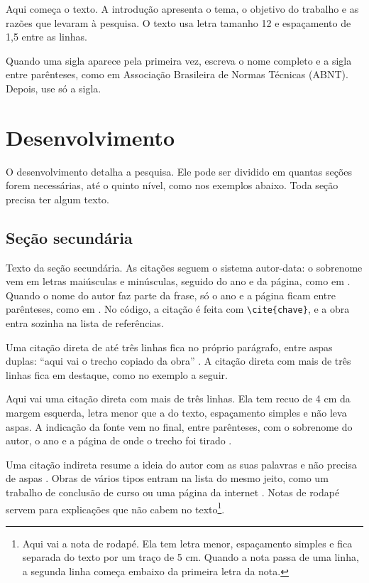 \documentclass[12pt,a4paper,oneside]{article}
\begin{document}
Aqui começa o texto. A introdução apresenta o tema, o objetivo do trabalho e as razões que levaram à pesquisa. O texto usa letra tamanho 12 e espaçamento de 1,5 entre as linhas.

Quando uma sigla aparece pela primeira vez, escreva o nome completo e a sigla entre parênteses, como em Associação Brasileira de Normas Técnicas (ABNT). Depois, use só a sigla.

\section{Desenvolvimento}

O desenvolvimento detalha a pesquisa. Ele pode ser dividido em quantas seções forem necessárias, até o quinto nível, como nos exemplos abaixo. Toda seção precisa ter algum texto.

\subsection{Seção secundária}

Texto da seção secundária. As citações seguem o sistema autor-data: o sobrenome vem em letras maiúsculas e minúsculas, seguido do ano e da página, como em \cite[p.~15]{livro2024}. Quando o nome do autor faz parte da frase, só o ano e a página ficam entre parênteses, como em . No código, a citação é feita com \texttt{\textbackslash cite\{chave\}}, e a obra entra sozinha na lista de referências.

Uma citação direta de até três linhas fica no próprio parágrafo, entre aspas duplas: “aqui vai o trecho copiado da obra” \cite[p.~32]{livro2024}. A citação direta com mais de três linhas fica em destaque, como no exemplo a seguir.

\begin{citacao}
Aqui vai uma citação direta com mais de três linhas. Ela tem recuo de 4 cm da margem esquerda, letra menor que a do texto, espaçamento simples e não leva aspas. A indicação da fonte vem no final, entre parênteses, com o sobrenome do autor, o ano e a página de onde o trecho foi tirado \cite[p.~47]{capitulo2023}.
\end{citacao}

Uma citação indireta resume a ideia do autor com as suas palavras e não precisa de aspas \cite{artigo2025}. Obras de vários tipos entram na lista do mesmo jeito, como um trabalho de conclusão de curso \cite{tcc2022} ou uma página da internet \cite{pagina2025}. Notas de rodapé servem para explicações que não cabem no texto\footnote{Aqui vai a nota de rodapé. Ela tem letra menor, espaçamento simples e fica separada do texto por um traço de 5 cm. Quando a nota passa de uma linha, a segunda linha começa embaixo da primeira letra da nota.}.
\end{document}
